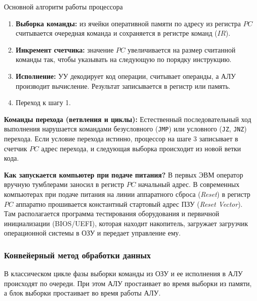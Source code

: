 \documentclass[11pt,a4paper]{article}
\begin{document}
\begin{definitionbox}{Основной алгоритм работы процессора}
\begin{enumerate}
    \item \textbf{Выборка команды:} из ячейки оперативной памяти по адресу из регистра $PC$ считывается очередная команда и сохраняется в регистре команд ($IR$).
    \item \textbf{Инкремент счетчика:} значение $PC$ увеличивается на размер считанной команды так, чтобы указывать на следующую по порядку инструкцию.
    \item \textbf{Исполнение:} УУ декодирует код операции, считывает операнды, а АЛУ производит вычисление. Результат записывается в регистр или память.
    \item Переход к шагу 1.
\end{enumerate}
\end{definitionbox}

\textbf{Команды перехода (ветвления и циклы):}  
Естественный последовательный ход выполнения нарушается командами безусловного (\texttt{JMP}) или условного (\texttt{JZ}, \texttt{JNZ}) перехода. Если условие перехода истинно, процессор на шаге 3 записывает в счетчик $PC$ адрес перехода, и следующая выборка происходит из новой ветки кода.

\textbf{Как запускается компьютер при подаче питания?}
В первых ЭВМ оператор вручную тумблерами заносил в регистр $PC$ начальный адрес. В современных компьютерах при подаче питания на линии аппаратного сброса (\textit{Reset}) в регистр $PC$ аппаратно прошивается константный стартовый адрес ПЗУ (\textit{Reset Vector}). Там располагается программа тестирования оборудования и первичной инициализации (BIOS/UEFI), которая находит накопитель, загружает загрузчик операционной системы в ОЗУ и передает управление ему.


\subsubsection{Конвейерный метод обработки данных}

В классическом цикле фазы выборки команды из ОЗУ и ее исполнения в АЛУ происходят по очереди. При этом АЛУ простаивает во время выборки из памяти, а блок выборки простаивает во время работы АЛУ.
\end{document}
